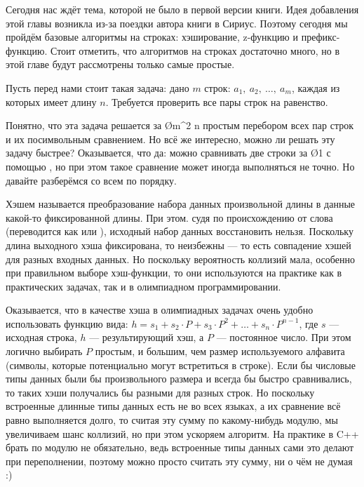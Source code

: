 Сегодня нас ждёт тема, которой не было в первой версии книги. Идея добавления этой главы возникла из-за поездки автора книги в Сириус. Поэтому сегодня мы пройдём базовые алгоритмы на строках: хэширование, z-функцию и префикс-функцию. Стоит отметить, что алгоритмов на строках достаточно много, но в этой главе будут рассмотрены только самые простые.


Пусть перед нами стоит такая задача: дано $m$ строк: $a_1,\ a_2,\ \ldots,\ a_m$, каждая из которых имеет длину $n$. Требуется проверить все пары строк на равенство.

Понятно, что эта задача решается за \O{m^2 \cdot n} простым перебором всех пар строк и их посимвольным сравнением. Но всё же интересно, можно ли решать эту задачу быстрее? Оказывается, что да: можно сравнивать две строки за \O{1} с помощью , но при этом такое сравнение может иногда выполняться не точно. Но давайте разберёмся со всем по порядку.

Хэшем называется преобразование набора данных произвольной длины в данные какой-то фиксированной длины. При этом. судя по происхождению от слова  (переводится как  или ), исходный набор данных восстановить нельзя. Поскольку длина выходного хэша фиксирована, то неизбежны  — то есть совпадение хэшей для разных входных данных. Но поскольку вероятность коллизий мала, особенно при правильном выборе хэш-функции, то они используются на практике как в практических задачах, так и в олимпиадном программировании.

Оказывается, что в качестве хэша в олимпиадных задачах очень удобно использовать функцию вида: $h = s_1 + s_2 \cdot P + s_3 \cdot P^2 + \ldots + s_n \cdot P^{n - 1}$, где $s$ — исходная строка, $h$ — результирующий хэш, а $P$ — постоянное число. При этом логично выбирать $P$ простым, и большим, чем размер используемого алфавита (символы, которые потенциально могут встретиться в строке). Если бы числовые типы данных были бы произвольного размера и всегда бы быстро сравнивались, то таких хэши получались бы разными для разных строк. Но поскольку встроенные длинные типы данных есть не во всех языках, а их сравнение всё равно выполняется долго, то считая эту сумму по какому-нибудь модулю, мы увеличиваем шанс коллизий, но при этом ускоряем алгоритм. На практике в C++ брать по модулю не обязательно, ведь встроенные типы данных сами это делают при переполнении, поэтому можно просто считать эту сумму, ни о чём не думая :)


